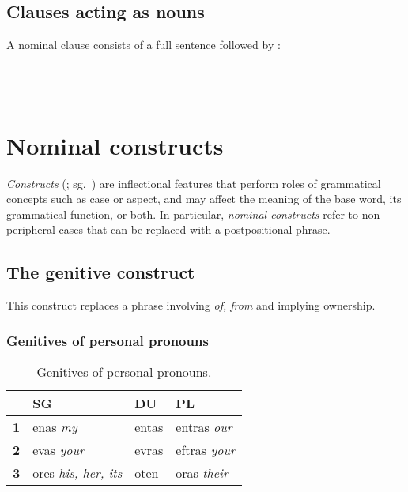 \documentclass{book}
\begin{document}
\section{Clauses acting as nouns}

A nominal clause consists of a full sentence followed by : \\
~\\
       \\
       \\
     

\chapter{Nominal constructs}

\emph{Constructs} (; sg.~) are inflectional features that perform roles of grammatical concepts such as case or aspect, and may affect the meaning of the base word, its grammatical function, or both. In particular, \emph{nominal constructs} refer to non-peripheral cases that can be replaced with a postpositional phrase.

\section{The genitive construct}

This construct replaces a phrase involving  \emph{of, from} and implying ownership.

\subsection{Genitives of personal pronouns}

\begin{table}[H]
  \caption{Genitives of personal pronouns.}
  \centering
  \begin{tabular}{|r|l|l|l|}
    \hline
    & \textbf{SG} & \textbf{DU} & \textbf{PL} \\ \hline
    \textbf{1} & enas \emph{my} & entas & entras \emph{our} \\ \hline
    \textbf{2} & evas \emph{your} & evras & eftras \emph{your} \\ \hline
    \textbf{3} & ores \emph{his, her, its} & oten & oras \emph{their} \\ \hline
  \end{tabular}
\end{table}
\end{document}
